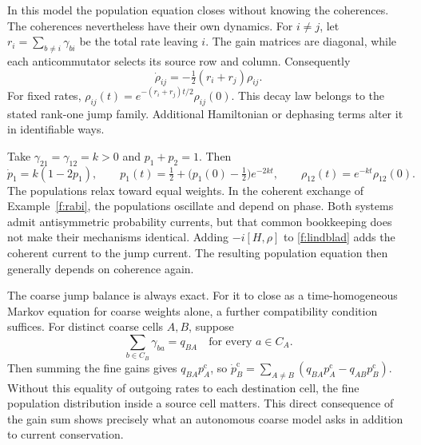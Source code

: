In this model the population equation closes without knowing the coherences. The coherences nevertheless have their own dynamics. For $i\ne j$, let $r_i=\sum_{b\ne i}\gamma_{bi}$ be the total rate leaving $i$. The gain matrices are diagonal, while each anticommutator selects its source row and column. Consequently
\begin{equation}\label{f:coherence-decay}
 \dot\rho_{ij}=-\tfrac12(r_i+r_j)\rho_{ij}.
\end{equation}
For fixed rates, $\rho_{ij}(t)=e^{-(r_i+r_j)t/2}\rho_{ij}(0)$. This decay law belongs to the stated rank-one jump family. Additional Hamiltonian or dephasing terms alter it in identifiable ways.

\begin{example}
Take $\gamma_{21}=\gamma_{12}=k>0$ and $p_1+p_2=1$. Then
\[
 \dot p_1=k(1-2p_1),\qquad
 p_1(t)=\tfrac12+\bigl(p_1(0)-\tfrac12\bigr)e^{-2kt},
 \qquad \rho_{12}(t)=e^{-kt}\rho_{12}(0).
\]
The populations relax toward equal weights. In the coherent exchange of Example~\ref{f:rabi}, the populations oscillate and depend on phase. Both systems admit antisymmetric probability currents, but that common bookkeeping does not make their mechanisms identical. Adding $-i[H,\rho]$ to \eqref{f:lindblad} adds the coherent current to the jump current. The resulting population equation then generally depends on coherence again.
\end{example}

The coarse jump balance is always exact. For it to close as a time-homogeneous Markov equation for coarse weights alone, a further compatibility condition suffices. For distinct coarse cells $A,B$, suppose
\[
 \sum_{b\in C_B}\gamma_{ba}=q_{BA}
 \quad\text{for every }a\in C_A.
\]
Then summing the fine gains gives $q_{BA}p_A^{\mathrm c}$, so
$\dot p_B^{\mathrm c}=\sum_{A\ne B}(q_{BA}p_A^{\mathrm c}-q_{AB}p_B^{\mathrm c})$.
Without this equality of outgoing rates to each destination cell, the fine population distribution inside a source cell matters. This direct consequence of the gain sum shows precisely what an autonomous coarse model asks in addition to current conservation.




